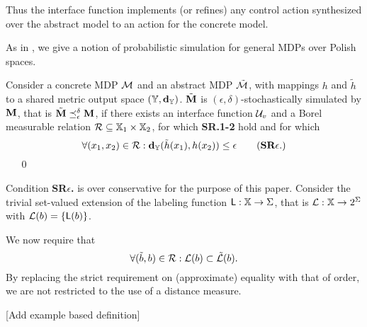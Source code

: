 \documentclass{ifacconf}
\newcommand{\red}[1]{{\color{red} #1}}
\begin{document}
Thus the interface function implements (or refines) any control action synthesized over the abstract model to an action for the concrete model.


As in \citep{haesaert2017verification},  we give a notion of probabilistic simulation for  general MDPs over Polish spaces.
%
\begin{definition}\label{def:apbsim}
Consider a concrete MDP $\mathcal{M}$ and an abstract  MDP $\tilde{\mathcal{M}}$, with mappings $h$ and  $\tilde h$  to a shared {metric} output space  $({\mathbb{Y}},\mathbf{d}_{\mathbb{Y}})$.   
	$\tilde{{\mathbf{M}}}$ is $(\epsilon,\delta)$-stochastically simulated by ${\mathbf{M}}$, that is $\tilde{{\mathbf{M}}}\preceq^{\delta}_\epsilon{\mathbf{M}}$,  if there exists an interface function $\mathcal{U}_{v}$ and
	a Borel measurable relation $\mathcal{R}\subseteq {\mathbb{X}}_1\times {\mathbb{X}}_2$, for which \textbf{SR.1-2} hold and for which 
	\begin{equation}
		\forall (x_1,x_2)\in \rel:\mathbf{d}_\Y(\tilde h(x_1),h(x_2))  \leq \epsilon\tag{\textbf{SR$\epsilon$}.}
	\end{equation} 
\mbox{ }	\hfill\mbox{ }\qed
\end{definition}
Condition \textbf{SR$\epsilon$.} is over conservative for the purpose of this paper. 
Consider the trivial set-valued extension of  the labeling function $\mathsf{L}:{\mathbb{X}}\rightarrow\Sigma$, that is  $\mathcal{L}:{\mathbb{X}}\rightarrow2^\Sigma$ with
 $\mathcal{L}(b)=\{\mathsf{L}(b)\}$.
 
We now require that \begin{equation}
  \forall (\tilde b,b)\in \mathcal{R}:  \mathcal{L}(b)\subset \tilde{\mathcal{L}}(b).
  \end{equation} 
By replacing the strict requirement on (approximate) equality with that of order,   we are not restricted to the use of a distance measure. %

\red{[Add example based definition]}
 
 
\end{document}
